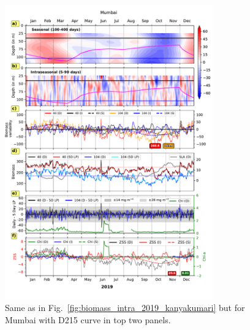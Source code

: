 \documentclass[12pt,a4paper]{article}
\begin{document}
\begin{figure}[htbp]
	\centering
	\includegraphics[width=0.8\textwidth]{./figures/biomass_intra_2019_mumbai.pdf} 
	\caption{Same as in Fig.~\ref{fig:biomass_intra_2019_kanyakumari} but for Mumbai with D215 curve in top two panels.}		
	\label{fig:biomass_intra_2019_mumbai}
\end{figure}
\end{document}
